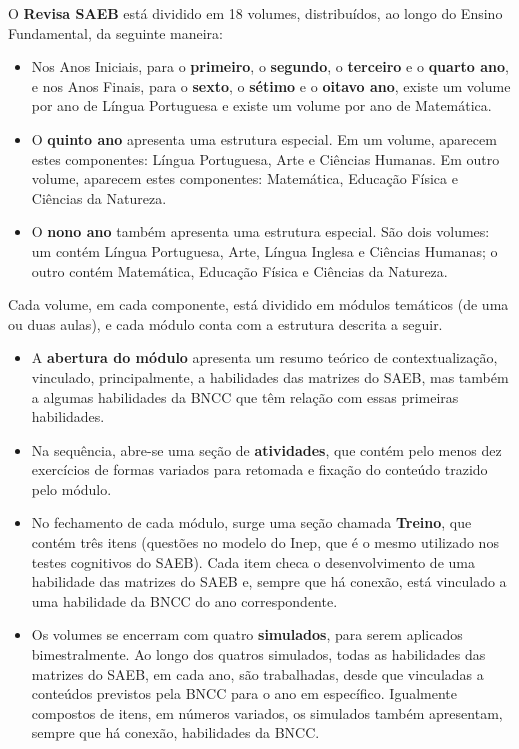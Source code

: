 O \textbf{Revisa SAEB} está dividido em 18 volumes, distribuídos, ao
longo do Ensino Fundamental, da seguinte maneira:

\begin{itemize}
\item
  Nos Anos Iniciais, para o \textbf{primeiro}, o \textbf{segundo}, o
  \textbf{terceiro} e o \textbf{quarto ano}, e nos Anos Finais, para o
  \textbf{sexto}, o \textbf{sétimo} e o \textbf{oitavo ano}, existe um
  volume por ano de Língua Portuguesa e existe um volume por ano de
  Matemática.
\item
  O \textbf{quinto ano} apresenta uma estrutura especial. Em um volume,
  aparecem estes componentes: Língua Portuguesa, Arte e Ciências
  Humanas. Em outro volume, aparecem estes componentes: Matemática,
  Educação Física e Ciências da Natureza.
\item
  O \textbf{nono ano} também apresenta uma estrutura especial. São dois
  volumes: um contém Língua Portuguesa, Arte, Língua Inglesa e Ciências
  Humanas; o outro contém Matemática, Educação Física e Ciências da
  Natureza.
\end{itemize}

Cada volume, em cada componente, está dividido em módulos temáticos (de
uma ou duas aulas), e cada módulo conta com a estrutura descrita a
seguir.

\begin{itemize}
\item
  A \textbf{abertura do módulo} apresenta um resumo teórico de
  contextualização, vinculado, principalmente, a habilidades das
  matrizes do SAEB, mas também a algumas habilidades da BNCC que têm
  relação com essas primeiras habilidades.
\item
  Na sequência, abre-se uma seção de \textbf{atividades}, que contém
  pelo menos dez exercícios de formas variados para retomada e fixação
  do conteúdo trazido pelo módulo.
\item
  No fechamento de cada módulo, surge uma seção chamada \textbf{Treino},
  que contém três itens (questões no modelo do Inep, que é o mesmo
  utilizado nos testes cognitivos do SAEB). Cada item checa o
  desenvolvimento de uma habilidade das matrizes do SAEB e, sempre que
  há conexão, está vinculado a uma habilidade da BNCC do ano
  correspondente.
\item
  Os volumes se encerram com quatro \textbf{simulados}, para serem
  aplicados bimestralmente. Ao longo dos quatros simulados, todas as
  habilidades das matrizes do SAEB, em cada ano, são trabalhadas, desde
  que vinculadas a conteúdos previstos pela BNCC para o ano em
  específico. Igualmente compostos de itens, em números variados, os
  simulados também apresentam, sempre que há conexão, habilidades da
  BNCC.
\end{itemize}
